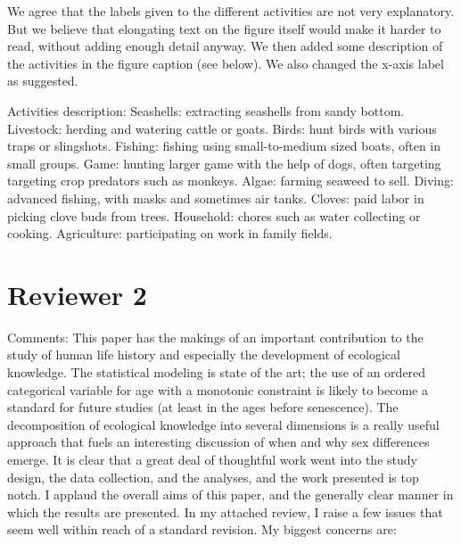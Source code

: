 \documentclass{article}
\newcommand{\rev}[1]{{\color{Red}#1}}
\newcommand{\comment}[1]{{\color{Blue}#1}}
\begin{document}
\begin{enumerate}
    \comment{We agree that the labels given to the different activities are not very explanatory. But we believe that elongating text on the figure itself would make it harder to read, without adding enough detail anyway. We then added some description of the activities in the figure caption (see below). We also changed the x-axis label as suggested.}
    
\rev{Activities description: Seashells: extracting seashells from sandy bottom. Livestock: herding and watering cattle or goats. Birds: hunt birds with various traps or slingshots. Fishing: fishing using small-to-medium sized boats, often in small groups. Game: hunting larger game with the help of dogs, often targeting targeting crop predators such as monkeys. Algae: farming seaweed to sell. Diving: advanced fishing, with masks and sometimes air tanks. Cloves: paid labor in picking clove buds from trees. Household: chores such as water collecting or cooking. Agriculture: participating on work in family fields. }
    
\end{enumerate}



\section{Reviewer 2}
Comments:
This paper has the makings of an important contribution to the study of human life history and especially the development of ecological knowledge. The statistical modeling is state of the art; the use of an ordered categorical variable for age with a monotonic constraint is likely to become a standard for future studies (at least in the ages before senescence). The decomposition of ecological knowledge into several dimensions is a really useful approach that fuels an interesting discussion of when and why sex differences emerge. It is clear that a great deal of thoughtful work went into the study design, the data collection, and the analyses, and the work presented is top notch. I applaud the overall aims of this paper, and the generally clear manner in which the results are presented. In my attached review, I raise a few issues that seem well within reach of a standard revision. My biggest concerns are:
\end{document}
